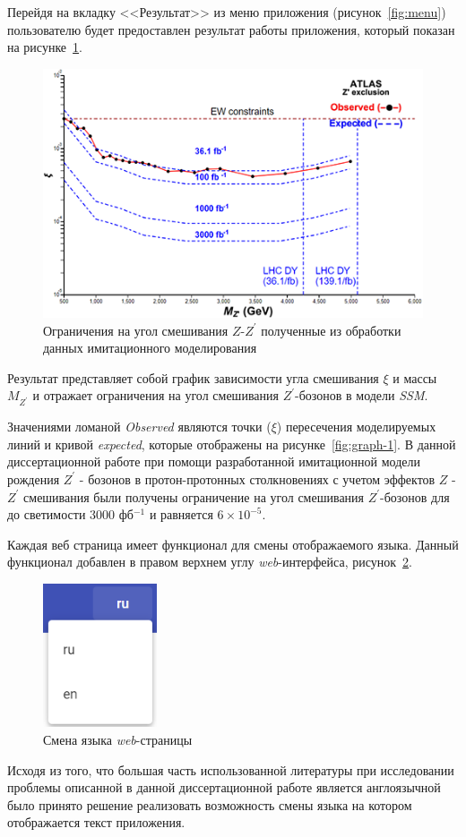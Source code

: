 Перейдя на вкладку <<Результат>> из меню приложения (рисунок~\ref{fig:menu}) пользователю будет предоставлен результат работы приложения, который показан на рисунке~\ref{fig:graph-result}.

\begin{figure}[!hp]
	\centering
	\includegraphics[width=\textwidth]{figures/graph-result.png}
	\caption{Ограничения на угол смешивания $Z$-${Z}^{\prime}$ полученные из обработки данных имитационного моделирования}
	\label{fig:graph-result}
\end{figure}

Результат представляет собой график зависимости угла смешивания $\xi$ и массы ${M}_{{Z}^{\prime}}$ и отражает ограничения на угол смешивания ${Z}^{\prime}$-бозонов в модели \textit{SSM}. 

Значениями ломаной \textit{Observed} являются точки ($\xi$) пересечения моделируемых линий и кривой \textit{expected}, которые отображены на рисунке~\ref{fig:graph-1}. В данной диссертационной работе при помощи разработанной имитационной модели рождения $Z^\prime$ - бозонов в протон-протонных столкновениях с учетом эффектов $Z$ - $Z^\prime$ смешивания были получены ограничение на угол смешивания ${Z}^{\prime}$-бозонов для до светимости 3000 фб${}^{−1}$ и равняется $6\times{10}^{-5}$.

Каждая веб страница имеет функционал для смены отображаемого языка. Данный функционал добавлен в правом верхнем углу \textit{web}-интерфейса, рисунок~\ref{fig:language-switch}.

\begin{figure}[!hp]
	\centering
	\includegraphics[width=0.3\textwidth]{figures/language-switch.png}
	\caption{Смена языка \textit{web}-страницы}
	\label{fig:language-switch}
\end{figure}

Исходя из того, что большая часть использованной литературы при исследовании проблемы описанной в данной диссертационной работе является англоязычной было принято решение реализовать возможность смены языка на котором отображается текст приложения.

